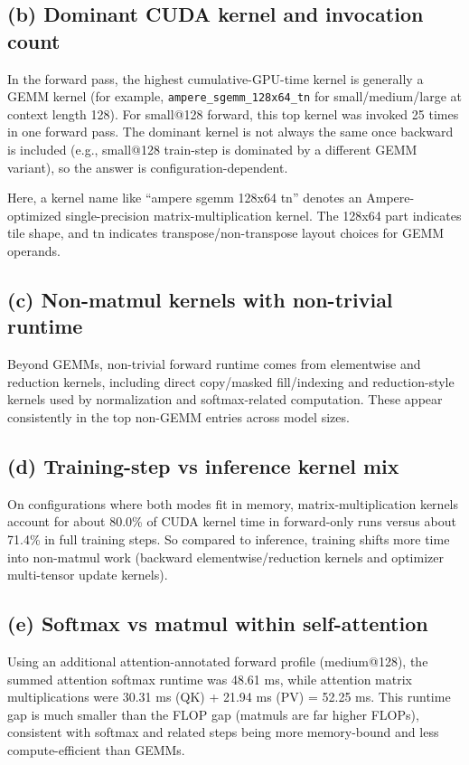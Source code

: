 \documentclass[11pt]{article}
\begin{document}
\subsection*{(b) Dominant CUDA kernel and invocation count}
In the forward pass, the highest cumulative-GPU-time kernel is generally a GEMM kernel (for example, \texttt{ampere\_sgemm\_128x64\_tn} for small/medium/large at context length 128). For small@128 forward, this top kernel was invoked 25 times in one forward pass. The dominant kernel is not always the same once backward is included (e.g., small@128 train-step is dominated by a different GEMM variant), so the answer is configuration-dependent.

Here, a kernel name like ``ampere sgemm 128x64 tn'' denotes an Ampere-optimized single-precision matrix-multiplication kernel. The 128x64 part indicates tile shape, and tn indicates transpose/non-transpose layout choices for GEMM operands.

\subsection*{(c) Non-matmul kernels with non-trivial runtime}
Beyond GEMMs, non-trivial forward runtime comes from elementwise and reduction kernels, including direct copy/masked fill/indexing and reduction-style kernels used by normalization and softmax-related computation. These appear consistently in the top non-GEMM entries across model sizes.

\subsection*{(d) Training-step vs inference kernel mix}
On configurations where both modes fit in memory, matrix-multiplication kernels account for about 80.0\% of CUDA kernel time in forward-only runs versus about 71.4\% in full training steps. So compared to inference, training shifts more time into non-matmul work (backward elementwise/reduction kernels and optimizer multi-tensor update kernels).

\subsection*{(e) Softmax vs matmul within self-attention}
Using an additional attention-annotated forward profile (medium@128), the summed attention softmax runtime was 48.61 ms, while attention matrix multiplications were 30.31 ms (QK) + 21.94 ms (PV) = 52.25 ms. This runtime gap is much smaller than the FLOP gap (matmuls are far higher FLOPs), consistent with softmax and related steps being more memory-bound and less compute-efficient than GEMMs.
\end{document}
